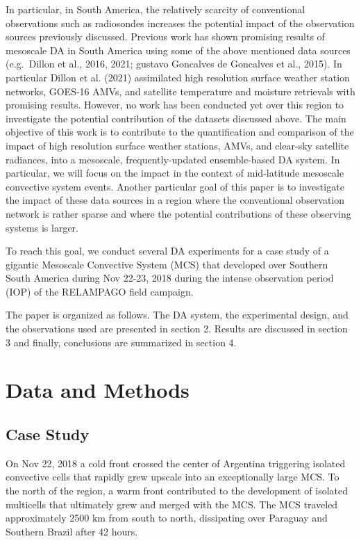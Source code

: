 \documentclass[authoryear,preprint,review,12pt]{elsarticle} %
\begin{document}
In particular, in South America, the relatively scarcity of conventional observations such as radiosondes increases the potential impact of the observation sources previously discussed. Previous work has shown promising results of mesoscale DA in South America using some of the above mentioned data sources (e.g.~Dillon et al., 2016, 2021; gustavo Goncalves de Goncalves et al., 2015). In particular Dillon et al. (2021) assimilated high resolution surface weather station networks, GOES-16 AMVs, and satellite temperature and moisture retrievals with promising results. However, no work has been conducted yet over this region to investigate the potential contribution of the datasets discussed above.
The main objective of this work is to contribute to the quantification and comparison of the impact of high resolution surface weather stations, AMVs, and clear-sky satellite radiances, into a mesoscale, frequently-updated ensemble-based DA system. In particular, we will focus on the impact in the context of mid-latitude mesoscale convective system events. Another particular goal of this paper is to investigate the impact of these data sources in a region where the conventional observation network is rather sparse and where the potential contributions of these observing systems is larger.

To reach this goal, we conduct several DA experiments for a case study of a gigantic Mesoscale Convective System (MCS) that developed over Southern South America during Nov 22-23, 2018 during the intense observation period (IOP) of the RELAMPAGO field campaign.

The paper is organized as follows. The DA system, the experimental design, and the observations used are presented in section 2. Results are discussed in section 3 and finally, conclusions are summarized in section 4.

\hypertarget{data-and-methods}{%
\section{Data and Methods}\label{data-and-methods}}

\hypertarget{case-study}{%
\subsection{Case Study}\label{case-study}}

On Nov 22, 2018 a cold front crossed the center of Argentina triggering isolated convective cells that rapidly grew upscale into an exceptionally large MCS. To the north of the region, a warm front contributed to the development of isolated multicells that ultimately grew and merged with the MCS.
The MCS traveled approximately 2500 km from south to north, dissipating over Paraguay and Southern Brazil after 42 hours.
\end{document}
